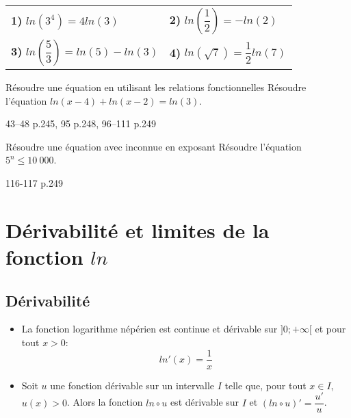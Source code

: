 \documentclass[a4paper]{article}
\begin{document}
\begin{example}{}{}
  \begin{tabularx}{.95\linewidth}{X X}
  \textbf{1)} $ln(3^4)=4ln(3)$ & \textbf{2)} $ln\left(\dfrac{1}{2}\right)=-ln(2)$\\
  \textbf{3)} $ln\left(\dfrac{5}{3}\right)=ln(5)-ln(3)$ & \textbf{4)} $ln\left(\sqrt{7}\right)=\dfrac{1}{2}ln(7)$\\
  \end{tabularx}
\end{example}

\begin{methode}{Résoudre une équation en utilisant les relations fonctionnelles}{}
  Résoudre l'équation  $ln(x-4)+ln(x-2)=ln(3)$.

  \vspace{4cm}
  

  \end{methode}

\begin{exercices}{}{}
43--48 p.245, 95 p.248, 96--111 p.249
\end{exercices}
\begin{methode}{Résoudre une équation avec inconnue en exposant}{}
  Résoudre l'équation  $5^n \leqslant 10~000$.

  \vspace{4cm}
  

  \end{methode}

\begin{exercices}{}{}
116-117 p.249
\end{exercices}


\pagebreak
\section{Dérivabilité et limites de la fonction $ln$}

\subsection{Dérivabilité}

\begin{propriete}{}{}

\begin{itemize}[label=\textbullet]
  \item 
  La fonction logarithme népérien est continue et dérivable sur $]0;+\infty[$ et pour tout $x>0$:
  $$ln'(x)=\dfrac{1}{x}$$
  \item Soit $u$ une fonction dérivable sur un intervalle $I$ telle que, pour tout $x\in I$, $u(x)>0$. Alors la fonction $ln \circ u$ est dérivable sur 
  $I$ et $(ln \circ u)'=\dfrac{u'}{u}$.
\end{itemize}
\end{propriete}
\end{document}
